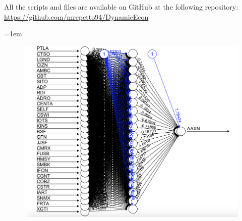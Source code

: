 \documentclass[twocolumn]{article}
\begin{document}
All the scripts and files are available on GitHub at the following repository:
\href{url}{https://github.com/mrepetto94/DynamicEcon} 

\newpage
\emergencystretch=1em
\sloppy

\printbibliography

\newpage
\newpage

\begin{figure}
\centering
\includegraphics[width=\linewidth, height=\textheight,keepaspectratio]{Paper/images/NN_plot.png}
\caption[short]{}
\label{NN_plot}
\end{figure}
\end{document}
